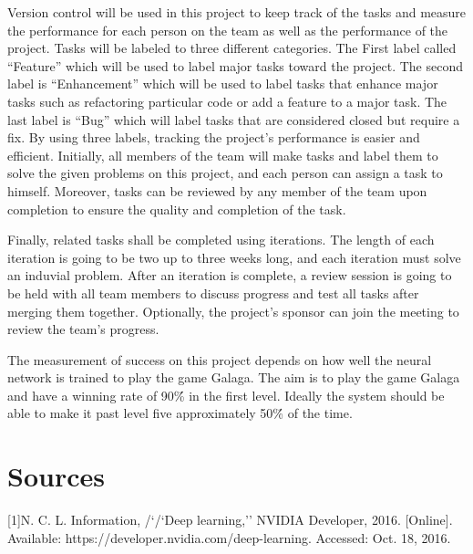 \documentclass[letterpaper,10pt]{article}
\begin{document}
Version control will be used in this project to keep track of the tasks and measure the performance for each person on the team as well as the performance of the project.
 Tasks will be labeled to three different categories.
 The First label called “Feature” which will be used to label major tasks toward the project.
 The second label is “Enhancement” which will be used to label tasks that enhance major tasks such as refactoring particular code or add a feature to a major task.
 The last label is “Bug” which will label tasks that are considered closed but require a fix.
 By using three labels, tracking the project’s performance is easier and efficient.
 Initially, all members of the team will make tasks and label them to solve the given problems on this project, and each person can assign a task to himself.
 Moreover, tasks can be reviewed by any member of the team upon completion to ensure the quality and completion of the task.


Finally, related tasks shall be completed using iterations.
 The length of each iteration is going to be two up to three weeks long, and each iteration must solve an induvial problem.
 After an iteration is complete, a review session is going to be held with all team members to discuss progress and test all tasks after merging them together.
 Optionally, the project’s sponsor can join the meeting to review the team's progress.

The measurement of success on this project depends on how well the neural network is trained to play the game Galaga.
The aim is to play the game Galaga and have a winning rate of 90\'\% in the first level.
Ideally the system should be able to make it past level five approximately 50\'\% of the time. 

\section{Sources}

[1]N. C. L. Information, /`/`Deep learning,'' NVIDIA Developer, 2016. [Online]. Available: https://developer.nvidia.com/deep-learning. Accessed: Oct. 18, 2016.
\end{document}
